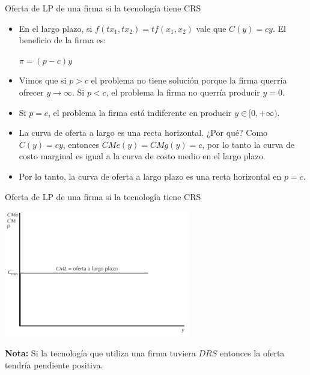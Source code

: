 \documentclass{beamer}
\theoremstyle{definition}
\begin{document}
\begin{frame}{Oferta de LP de una firma si la tecnología tiene CRS}
\begin{itemize}
\item En el largo plazo, si $f(tx_1,tx_2)=tf(x_1,x_2)$ vale que $C(y)=cy$. El beneficio de la firma es:
\begin{center}
$\pi =(p-c)y$
\end{center}
\item Vimos que si $p>c$ el problema no tiene soluci\'{o}n porque la firma querría ofrecer $y\rightarrow
\infty$. Si $p<c$, el problema la firma no querría producir $y=0$.
\item Si $p=c$, el problema la firma está indiferente en producir $y\in [0,+\infty)$.


\item La curva de oferta a largo es una recta horizontal. ¿Por qué? Como $C(y)=cy$, entonces $CMe(y)=CMg(y)=c$, por lo tanto la curva de costo marginal es igual a la curva de costo medio en el largo plazo. %

\item Por lo tanto, la curva de oferta a
largo plazo es una recta horizontal en $p=c$.

\end{itemize}
\end{frame}

\begin{frame}{Oferta de LP de una firma si la tecnología tiene CRS}
\begin{center}
\includegraphics[width=3.2in]{figures4/RCSLP.png}
\end{center}

\medskip

\textbf{Nota:} Si la tecnología que utiliza una firma tuviera $DRS$ entonces la oferta tendría pendiente positiva. 
\end{frame}
\end{document}
